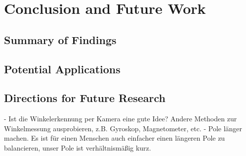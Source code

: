 \chapter{Conclusion and Future Work}

\section{Summary of Findings}

\section{Potential Applications}

\section{Directions for Future Research}
- Ist die Winkelerkennung per Kamera eine gute Idee? Andere Methoden zur Winkelmessung ausprobieren, z.B. Gyroskop, Magnetometer, etc.
- Pole länger machen. Es ist für einen Menschen auch einfacher einen längeren Pole zu balancieren, unser Pole ist verhältnismäßig kurz.